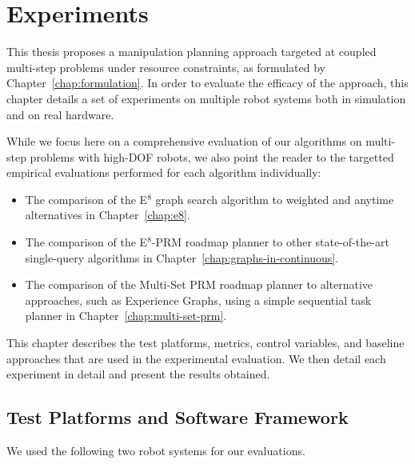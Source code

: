 \chapter{Experiments}
\label{chap:experiments}

This thesis proposes a manipulation planning approach targeted
at coupled multi-step problems under resource constraints,
as formulated by Chapter~\ref{chap:formulation}.
In order to evaluate the efficacy of the approach,
this chapter details a set of experiments on multiple robot systems
both in simulation and on real hardware.

While we focus here on a comprehensive evaluation of our algorithms
on multi-step problems with high-DOF robots,
we also point the reader to the targetted empirical evaluations
performed for each algorithm individually:
\begin{itemize}
\item The comparison of the E$^8$ graph search algorithm to
   weighted and anytime alternatives in Chapter~\ref{chap:e8}.
\item The comparison of the E$^8$-PRM roadmap planner to
   other state-of-the-art single-query algorithms in
   Chapter~\ref{chap:graphs-in-continuous}.
\item The comparison of the Multi-Set PRM roadmap planner to
   alternative approaches, such as Experience Graphs,
   using a simple sequential task planner
   in Chapter~\ref{chap:multi-set-prm}.
\end{itemize}

This chapter describes the test platforms,
metrics,
control variables,
and baseline approaches that are used in the experimental
evaluation.
We then detail each experiment in detail
and present the results obtained.

\section{Test Platforms and Software Framework}

We used the following two robot systems for our evaluations.

